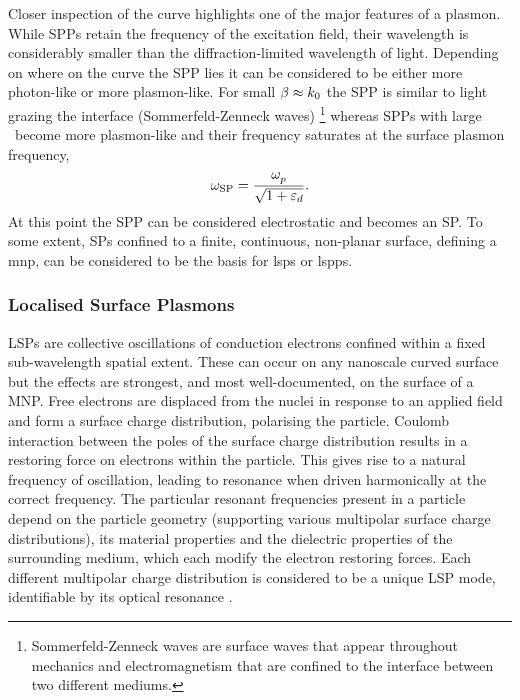 \documentclass{article}
\begin{document}
Closer inspection of the curve highlights one of the major features of a plasmon. While SPPs retain the frequency of the excitation field, their wavelength is considerably smaller than the diffraction-limited wavelength of light.
Depending on where on the curve the SPP lies it can be considered to be either more photon-like or more plasmon-like. For small $\beta\approx k_0$ the SPP is similar to light grazing the interface (Sommerfeld-Zenneck waves)%
\footnote{Sommerfeld-Zenneck waves are surface waves that appear throughout mechanics and electromagnetism that are confined to the interface between two different mediums.}
whereas SPPs with large \wvm\ become more plasmon-like and their frequency saturates at the surface plasmon frequency,
\begin{equation}
	\omega_{\mathrm{SP}} = \frac{\omega_{p}^{}}{\sqrt{1+\varepsilon_d}}.
\end{equation}
At this point the SPP can be considered electrostatic and becomes an SP. To some extent, SPs confined to a finite, continuous, non-planar surface, defining a \gls{mnp}, can be considered to be the basis for \glspl{lsp} or \glspl{lspp}.

\subsubsection{Localised Surface Plasmons}

LSPs are collective oscillations of conduction electrons confined within a fixed sub-wavelength spatial extent. These can occur on any nanoscale curved surface but the effects are strongest, and most well-documented, on the surface of a MNP. Free electrons are displaced from the nuclei in response to an applied field and form a surface charge distribution, polarising the particle. Coulomb interaction between the poles of the surface charge distribution results in a restoring force on electrons within the particle. This gives rise to a natural frequency of oscillation, leading to resonance when driven harmonically at the correct frequency. The particular resonant frequencies present in a particle depend on the particle geometry (supporting various multipolar surface charge distributions), its material properties and the dielectric properties of the surrounding medium, which each modify the electron restoring forces. Each different multipolar charge distribution is considered to be a unique LSP mode, identifiable by its optical resonance \cite{murray2007}.
\end{document}

